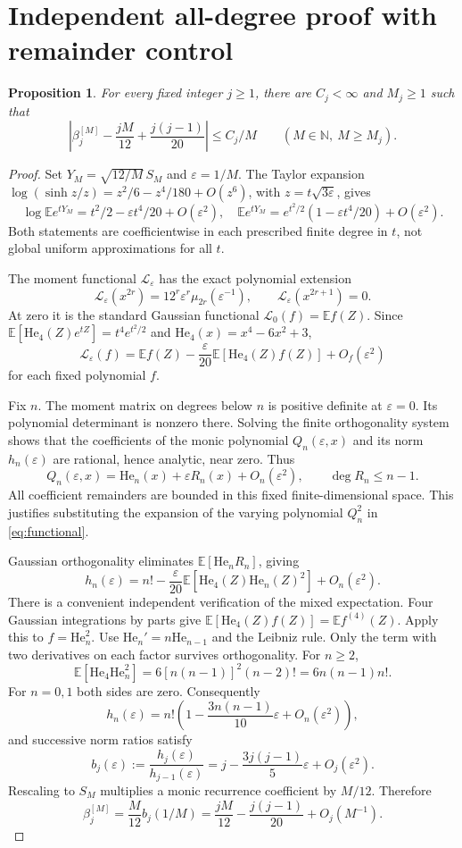 \documentclass[11pt,a4paper]{article}
\newcommand{\E}{\mathbb E}
\newcommand{\N}{\mathbb N}
\newcommand{\He}{\mathrm{He}}
\newtheorem{proposition}{Proposition}
\begin{document}
\section{Independent all-degree proof with remainder control}
\begin{proposition}
For every fixed integer $j\geq1$, there are $C_j<\infty$ and $M_j\geq1$ such that
\[
\left|\beta_j^{[M]}-\frac{jM}{12}+\frac{j(j-1)}{20}\right|
\leq C_j/M\qquad(M\in\N,\ M\geq M_j).
\]
\end{proposition}
\begin{proof}
Set $Y_M=\sqrt{12/M}\,S_M$ and $\varepsilon=1/M$. The Taylor expansion
$\log(\sinh z/z)=z^2/6-z^4/180+O(z^6)$, with $z=t\sqrt{3\varepsilon}$, gives
\[
\log\E e^{tY_M}=t^2/2-\varepsilon t^4/20+O(\varepsilon^2),
\quad
\E e^{tY_M}=e^{t^2/2}(1-\varepsilon t^4/20)+O(\varepsilon^2).
\]
Both statements are coefficientwise in each prescribed finite degree in $t$, not global uniform approximations for all $t$.

The moment functional $\mathcal L_\varepsilon$ has the exact polynomial extension
\[
\mathcal L_\varepsilon(x^{2r})
=12^r\varepsilon^r\mu_{2r}(\varepsilon^{-1}),\qquad
\mathcal L_\varepsilon(x^{2r+1})=0.
\]
At zero it is the standard Gaussian functional $\mathcal L_0(f)=\E f(Z)$. Since
$\E[\He_4(Z)e^{tZ}]=t^4e^{t^2/2}$ and $\He_4(x)=x^4-6x^2+3$,
\begin{equation}
\mathcal L_\varepsilon(f)=\E f(Z)
-\frac{\varepsilon}{20}\E[\He_4(Z)f(Z)]
+O_f(\varepsilon^2)
\label{eq:functional}
\end{equation}
for each fixed polynomial $f$.

Fix $n$. The moment matrix on degrees below $n$ is positive definite at $\varepsilon=0$. Its polynomial determinant is nonzero there. Solving the finite orthogonality system shows that the coefficients of the monic polynomial $Q_n(\varepsilon,x)$ and its norm $h_n(\varepsilon)$ are rational, hence analytic, near zero. Thus
\[
Q_n(\varepsilon,x)=\He_n(x)+\varepsilon R_n(x)+O_n(\varepsilon^2),
\qquad \deg R_n\leq n-1.
\]
All coefficient remainders are bounded in this fixed finite-dimensional space. This justifies substituting the expansion of the varying polynomial $Q_n^2$ in \eqref{eq:functional}.

Gaussian orthogonality eliminates $\E[\He_nR_n]$, giving
\[
h_n(\varepsilon)=n!-\frac{\varepsilon}{20}
\E[\He_4(Z)\He_n(Z)^2]+O_n(\varepsilon^2).
\]
There is a convenient independent verification of the mixed expectation. Four Gaussian integrations by parts give
$\E[\He_4(Z)f(Z)]=\E f^{(4)}(Z)$.
Apply this to $f=\He_n^2$. Use $\He_n'=n\He_{n-1}$ and the Leibniz rule. Only the term with two derivatives on each factor survives orthogonality. For $n\geq2$,
\[
\E[\He_4\He_n^2]=6[n(n-1)]^2(n-2)!=6n(n-1)n!.
\]
For $n=0,1$ both sides are zero. Consequently
\[
h_n(\varepsilon)=n!\left(1-\frac{3n(n-1)}{10}\varepsilon
+O_n(\varepsilon^2)\right),
\]
and successive norm ratios satisfy
\[
b_j(\varepsilon):=\frac{h_j(\varepsilon)}{h_{j-1}(\varepsilon)}
=j-\frac{3j(j-1)}5\varepsilon+O_j(\varepsilon^2).
\]
Rescaling to $S_M$ multiplies a monic recurrence coefficient by $M/12$. Therefore
\[
\beta_j^{[M]}=\frac{M}{12}b_j(1/M)
=\frac{jM}{12}-\frac{j(j-1)}{20}+O_j(M^{-1}).
\]


\end{proof}
\end{document}
